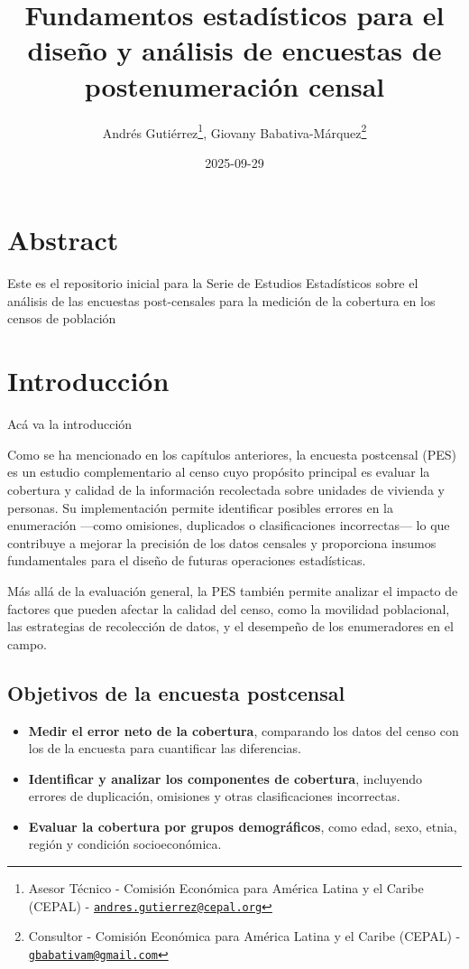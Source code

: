 \documentclass[
  12pt,
]{book}
\title{Fundamentos estadísticos para el diseño y análisis de encuestas de postenumeración censal}
\author{Andrés Gutiérrez\footnote{Asesor Técnico - Comisión Económica para América Latina y el Caribe (CEPAL) - \href{mailto:andres.gutierrez@cepal.org}{\nolinkurl{andres.gutierrez@cepal.org}}}, Giovany Babativa-Márquez\footnote{Consultor - Comisión Económica para América Latina y el Caribe (CEPAL) - \href{mailto:gbabativam@gmail.com}{\nolinkurl{gbabativam@gmail.com}}}}
\date{2025-09-29}
\providecommand{\tightlist}{%
  \setlength{\itemsep}{0pt}\setlength{\parskip}{0pt}}
\begin{document}
\maketitle

{
\hypersetup{linkcolor=}
\setcounter{tocdepth}{0}
\tableofcontents
}
\listoffigures
\listoftables
\chapter*{Abstract}\label{abstract}

Este es el repositorio inicial para la Serie de Estudios Estadísticos sobre el análisis de las encuestas post-censales para la medición de la cobertura en los censos de población

\chapter{Introducción}\label{cap1}

Acá va la introducción

Como se ha mencionado en los capítulos anteriores, la encuesta postcensal (PES) es un estudio complementario al censo cuyo propósito principal es evaluar la cobertura y calidad de la información recolectada sobre unidades de vivienda y personas. Su implementación permite identificar posibles errores en la enumeración ---como omisiones, duplicados o clasificaciones incorrectas--- lo que contribuye a mejorar la precisión de los datos censales y proporciona insumos fundamentales para el diseño de futuras operaciones estadísticas.

Más allá de la evaluación general, la PES también permite analizar el impacto de factores que pueden afectar la calidad del censo, como la movilidad poblacional, las estrategias de recolección de datos, y el desempeño de los enumeradores en el campo.

\section{Objetivos de la encuesta postcensal}\label{objetivos-de-la-encuesta-postcensal}

\begin{itemize}
\tightlist
\item
  \textbf{Medir el error neto de la cobertura}, comparando los datos del censo con los de la encuesta para cuantificar las diferencias.
\item
  \textbf{Identificar y analizar los componentes de cobertura}, incluyendo errores de duplicación, omisiones y otras clasificaciones incorrectas.
\item
  \textbf{Evaluar la cobertura por grupos demográficos}, como edad, sexo, etnia, región y condición socioeconómica.
\end{itemize}
\end{document}
